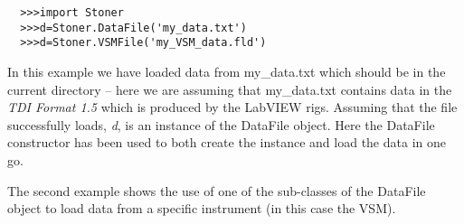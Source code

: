\documentclass[a4paper,11pt]{scrartcl}
\begin{document}
\begin{verbatim}
  >>>import Stoner
  >>>d=Stoner.DataFile('my_data.txt')
  >>>d=Stoner.VSMFile('my_VSM_data.fld')
\end{verbatim}

In this example we have loaded data from my\_data.txt which should be in the
current directory -- here we are assuming that my\_data.txt contains data in the
\textit{TDI Format 1.5} which is produced by the LabVIEW rigs. Assuming that the
file successfully loads, \textit{d}, is an instance of the DataFile object. Here
the DataFile constructor has been used to both create the instance and load the
data in one go.

The second example shows the use of one of the sub-classes of the DataFile object to load data from a specific instrument (in this case the VSM).

\end{document}
